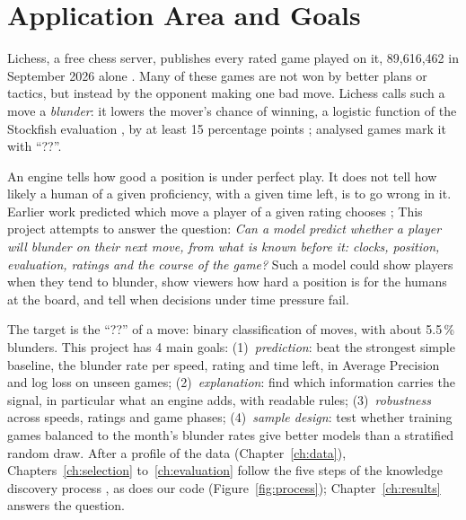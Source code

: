 \documentclass[a4paper,oneside,bibliography=totoc]{scrbook}
\newcommand{\stale}[1]{\textcolor{BurntOrange}{#1}}
\begin{document}
\mainmatter

\chapter{Application Area and Goals}
\label{ch:goals}
\suppressfloats[t] %

Lichess, a free chess server, publishes every rated game played on it, 89,616,462 in September 2026 alone
\cite{lichessdb}. Many of these games are not won by better plans or tactics, but instead by the opponent 
making one bad move. Lichess calls such a move a \emph{blunder}: it lowers the mover's
chance of winning, a logistic function of the Stockfish evaluation \cite{lichessaccuracy}, by at least 15
percentage points \cite{lichessadvice}; analysed games mark it with ``??''.

An engine tells how good a position is under perfect play. It does not tell how likely a human of a given 
proficiency, with a given time left, is to go wrong in it. Earlier work predicted which move a player of a given rating chooses
\cite{mcilroyyoung2020maia}; This project attempts to answer the question: \emph{Can a model predict whether a player will blunder on their next
move, from what is known before it: clocks, position, evaluation, ratings and the course of the game?} Such a
model could show players when they tend to blunder, show viewers how hard a position is for the humans at the
board, and tell when decisions under time pressure fail.

The target is the ``??'' of a move: binary classification of moves, with about \stale{5.5}\,\% blunders. This project has 4 main
goals: (1)~\emph{prediction}: beat the strongest simple baseline, the blunder rate per speed, rating and time
left, in Average Precision and log loss on unseen games; (2)~\emph{explanation}: find which information
carries the signal, in particular what an engine adds, with readable rules; (3)~\emph{robustness} across
speeds, ratings and game phases; (4)~\emph{sample design}: test whether training games balanced to the month's
blunder rates give better models than a stratified random draw. After a profile of the data
(Chapter~\ref{ch:data}), Chapters~\ref{ch:selection} to~\ref{ch:evaluation} follow the five steps of the
knowledge discovery process \cite{fayyad1996kdd}, as does our code (Figure~\ref{fig:process});
Chapter~\ref{ch:results} answers the question.
\end{document}

